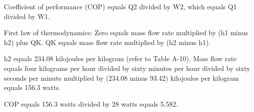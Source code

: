 Coefficient of performance (COP) equals Q2 divided by W2, which equals Q1 divided by W1.  

First law of thermodynamics: Zero equals mass flow rate multiplied by (h1 minus h2) plus QK.  
QK equals mass flow rate multiplied by (h2 minus h1).  

h2 equals 234.08 kilojoules per kilogram (refer to Table A-10).  
Mass flow rate equals four kilograms per hour divided by sixty minutes per hour divided by sixty seconds per minute multiplied by (234.08 minus 93.42) kilojoules per kilogram equals 156.3 watts.  

COP equals 156.3 watts divided by 28 watts equals 5.582.